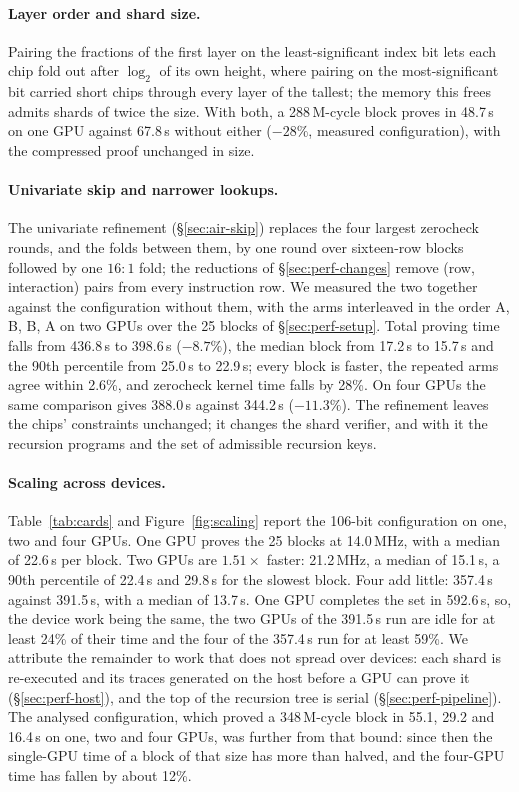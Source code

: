 \paragraph{Layer order and shard size.}\label{sec:perf-after} Pairing the fractions of the first \LogUp{} layer on the least-significant index bit lets each chip fold out after $\log_2$ of its own height, where pairing on the most-significant bit carried short chips through every layer of the tallest; the memory this frees admits shards of twice the size. With both, a 288\,M-cycle block proves in 48.7\,s on one GPU against 67.8\,s without either ($-28\%$, measured configuration), with the compressed proof unchanged in size.

\paragraph{Univariate skip and narrower lookups.}\label{sec:perf-skip} The univariate refinement (\S\ref{sec:air-skip}) replaces the four largest zerocheck rounds, and the folds between them, by one round over sixteen-row blocks followed by one $16{:}1$ fold; the reductions of \S\ref{sec:perf-changes} remove (row, interaction) pairs from every instruction row. We measured the two together against the configuration without them, with the arms interleaved in the order A, B, B, A on two GPUs over the 25 blocks of \S\ref{sec:perf-setup}. Total proving time falls from 436.8\,s to 398.6\,s ($-8.7\%$), the median block from 17.2\,s to 15.7\,s and the 90th percentile from 25.0\,s to 22.9\,s; every block is faster, the repeated arms agree within 2.6\%, and zerocheck kernel time falls by 28\%. On four GPUs the same comparison gives 388.0\,s against 344.2\,s ($-11.3\%$). The refinement leaves the chips' constraints unchanged; it changes the shard verifier, and with it the recursion programs and the set of admissible recursion keys.

\paragraph{Scaling across devices.}\label{sec:perf-scaling} Table~\ref{tab:cards} and Figure~\ref{fig:scaling} report the 106-bit configuration on one, two and four GPUs. One GPU proves the 25 blocks at 14.0\,MHz, with a median of 22.6\,s per block. Two GPUs are $1.51\times$ faster: 21.2\,MHz, a median of 15.1\,s, a 90th percentile of 22.4\,s and 29.8\,s for the slowest block. Four add little: 357.4\,s against 391.5\,s, with a median of 13.7\,s. One GPU completes the set in 592.6\,s, so, the device work being the same, the two GPUs of the 391.5\,s run are idle for at least 24\% of their time and the four of the 357.4\,s run for at least 59\%. We attribute the remainder to work that does not spread over devices: each shard is re-executed and its traces generated on the host before a GPU can prove it (\S\ref{sec:perf-host}), and the top of the recursion tree is serial (\S\ref{sec:perf-pipeline}). The analysed configuration, which proved a 348\,M-cycle block in 55.1, 29.2 and 16.4\,s on one, two and four GPUs, was further from that bound: since then the single-GPU time of a block of that size has more than halved, and the four-GPU time has fallen by about 12\%.

